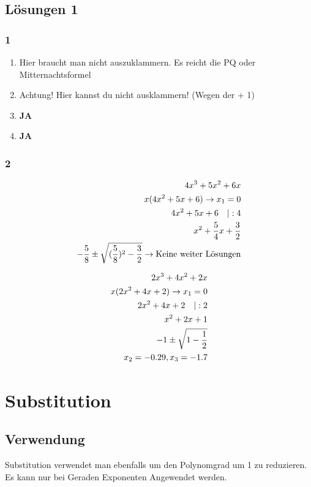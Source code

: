 \documentclass[11pt,a4paper]{article}
\begin{document}
\newpage

\subsection{Lösungen 1}

\subsubsection*{1}

\begin{enumerate}
\item Hier braucht man nicht auszuklammern. Es reicht die PQ oder Mitternachtsformel
\item Achtung! Hier kannst du nicht ausklammern! (Wegen der + 1)
\item \textbf{JA}
\item \textbf{JA}
\end{enumerate}

\subsubsection*{2}

\begin{eqnarray}
4x^3 + 5x^2 + 6x\\
x(4x^2 + 5x + 6) \rightarrow x_1 = 0\\
4x^2 + 5x + 6 \quad \text{\textbar} : 4\\
x^2 + \dfrac{5}{4} x + \dfrac{3}{2}\\
-\dfrac{5}{8} \pm \sqrt{(\dfrac{5}{8})^2 - \dfrac{3}{2}} \rightarrow \text{Keine weiter Lösungen}
\end{eqnarray}

\begin{eqnarray}
2x^3 + 4x^2 + 2x\\
x(2x^2 + 4x + 2) \rightarrow x_1 = 0\\
2x^2 + 4x + 2 \quad \text{\textbar} : 2\\
x^2 + 2x + 1\\
-1 \pm \sqrt{1-\dfrac{1}{2}}\\
x_2 = -0.29, x_3 = -1.7
\end{eqnarray}

\newpage

\section{Substitution}

\subsection{Verwendung}
Substitution verwendet man ebenfalls um den Polynomgrad um 1 zu reduzieren. Es kann nur bei Geraden Exponenten Angewendet werden.
\end{document}
